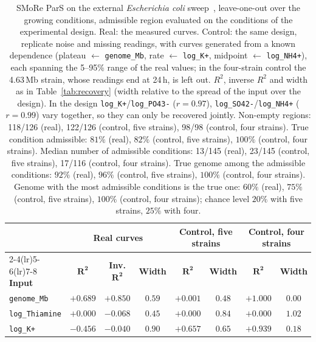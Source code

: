\begin{table}[!htbp]
\caption{SMoRe ParS on the external \textit{Escherichia coli} sweep~\cite{gongying2025}, leave-one-out over the growing conditions, admissible region evaluated on the conditions of the experimental design. Real: the measured curves. Control: the same design, replicate noise and missing readings, with curves generated from a known dependence (plateau $\leftarrow$ \texttt{genome\_Mb}, rate $\leftarrow$ \texttt{log\_K+}, midpoint $\leftarrow$ \texttt{log\_NH4+}), each spanning the 5--95\% range of the real values; in the four-strain control the 4.63\,Mb strain, whose readings end at 24\,h, is left out. $R^2$, inverse $R^2$ and width as in Table~\ref{tab:recovery} (width relative to the spread of the input over the design). In the design \texttt{log\_K+}/\texttt{log\_PO43-} ($r=0.97$), \texttt{log\_SO42-}/\texttt{log\_NH4+} ($r=0.99$) vary together, so they can only be recovered jointly. Non-empty regions: 118/126 (real), 122/126 (control, five strains), 98/98 (control, four strains). True condition admissible: $81\%$ (real), $82\%$ (control, five strains), $100\%$ (control, four strains). Median number of admissible conditions: 13/145 (real), 23/145 (control, five strains), 17/116 (control, four strains). True genome among the admissible conditions: $92\%$ (real), $96\%$ (control, five strains), $100\%$ (control, four strains). Genome with the most admissible conditions is the true one: $60\%$ (real), $75\%$ (control, five strains), $100\%$ (control, four strains); chance level $20\%$ with five strains, $25\%$ with four.}
\label{tab:external}
\centering\footnotesize
\setlength{\tabcolsep}{3pt}
\begin{tabular}{lccccccc}
\toprule
 & \multicolumn{3}{c}{\textbf{Real curves}} & \multicolumn{2}{c}{\textbf{Control, five strains}} & \multicolumn{2}{c}{\textbf{Control, four strains}} \\
\cmidrule(lr){2-4}\cmidrule(lr){5-6}\cmidrule(lr){7-8}
\textbf{Input} & $\mathbf{R^2}$ & \textbf{Inv. }$\mathbf{R^2}$ & \textbf{Width} & $\mathbf{R^2}$ & \textbf{Width} & $\mathbf{R^2}$ & \textbf{Width} \\
\midrule
\texttt{genome\_Mb} & $+0.689$ & $+0.850$ & $0.59$ & $+0.001$ & $0.48$ & $+1.000$ & $0.00$ \\
\texttt{log\_Thiamine} & $+0.000$ & $-0.068$ & $0.45$ & $+0.000$ & $0.84$ & $+0.000$ & $1.02$ \\
\texttt{log\_K+} & $-0.456$ & $-0.040$ & $0.90$ & $+0.657$ & $0.65$ & $+0.939$ & $0.18$ \\

\end{tabular}
\end{table}
